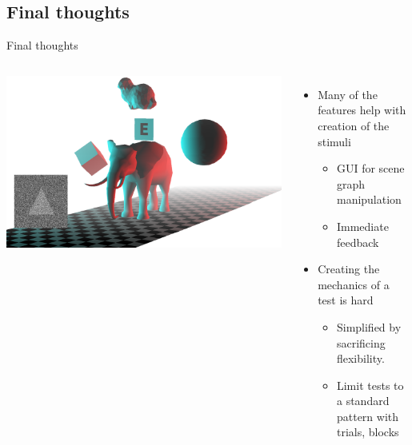 \documentclass[12pt,ucs,hyperref={pdftext}]{beamer}
\newlength{\columnleft}
\newlength{\columnright}
\begin{document}
\subsection{Final thoughts}

\begin{frame}{Final thoughts}
\begin{columns}

\column{\columnleft}
\includegraphics[width=\columnleft]{media/title.png}

\column{\columnright}
\begin{itemize}%
\item Many of the features help with creation of the stimuli
\begin{itemize}
\item GUI for scene graph manipulation
\item Immediate feedback
\end{itemize}
\item Creating the mechanics of a test is hard
\begin{itemize}
\item Simplified by sacrificing flexibility.
\item Limit tests to a standard pattern with trials, blocks
\end{itemize}
\end{itemize}

\end{columns}
\end{frame}
\end{document}
